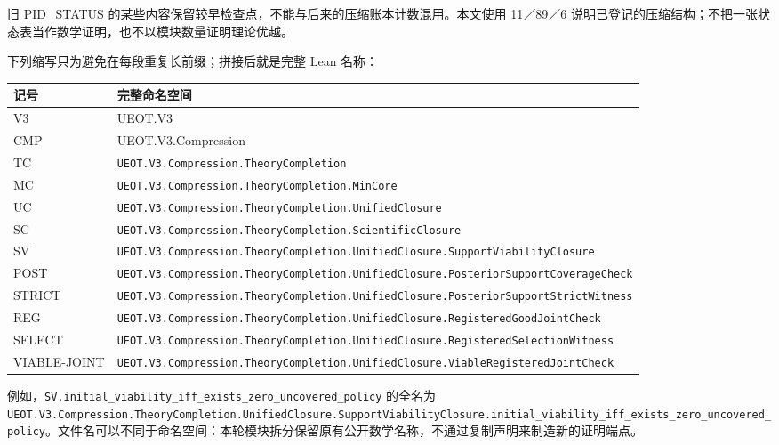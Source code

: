 \documentclass[
  11pt,
  oneside]{book}
\newcounter{none} %
\begin{document}
旧 PID\_STATUS 的某些内容保留较早检查点，不能与后来的压缩账本计数混用。本文使用 11／89／6 说明已登记的压缩结构；不把一张状态表当作数学证明，也不以模块数量证明理论优越。

下列缩写只为避免在每段重复长前缀；拼接后就是完整 Lean 名称：

{\def\LTcaptype{none} %
\begin{longtable}[]{@{}
  >{\raggedright\arraybackslash}p{}
  >{\raggedright\arraybackslash}p{}@{}}
\toprule\noalign{}
\begin{minipage}[b]{\linewidth}\raggedright
记号
\end{minipage} & \begin{minipage}[b]{\linewidth}\raggedright
完整命名空间
\end{minipage} \\
\midrule\noalign{}
\endhead
\bottomrule\noalign{}
\endlastfoot
V3 & UEOT.V3 \\
CMP & UEOT.V3.Compression \\
TC & \nolinkurl{UEOT.V3.Compression.TheoryCompletion} \\
MC & \nolinkurl{UEOT.V3.Compression.TheoryCompletion.MinCore} \\
UC & \nolinkurl{UEOT.V3.Compression.TheoryCompletion.UnifiedClosure} \\
SC & \nolinkurl{UEOT.V3.Compression.TheoryCompletion.ScientificClosure} \\
SV & \nolinkurl{UEOT.V3.Compression.TheoryCompletion.UnifiedClosure.SupportViabilityClosure} \\
POST & \nolinkurl{UEOT.V3.Compression.TheoryCompletion.UnifiedClosure.PosteriorSupportCoverageCheck} \\
STRICT & \nolinkurl{UEOT.V3.Compression.TheoryCompletion.UnifiedClosure.PosteriorSupportStrictWitness} \\
REG & \nolinkurl{UEOT.V3.Compression.TheoryCompletion.UnifiedClosure.RegisteredGoodJointCheck} \\
SELECT & \nolinkurl{UEOT.V3.Compression.TheoryCompletion.UnifiedClosure.RegisteredSelectionWitness} \\
VIABLE-JOINT & \nolinkurl{UEOT.V3.Compression.TheoryCompletion.UnifiedClosure.ViableRegisteredJointCheck} \\
\end{longtable}
}

例如，\nolinkurl{SV.initial_viability_iff_exists_zero_uncovered_policy} 的全名为 \nolinkurl{UEOT.V3.Compression.TheoryCompletion.UnifiedClosure.SupportViabilityClosure.initial_viability_iff_exists_zero_uncovered_policy}。文件名可以不同于命名空间：本轮模块拆分保留原有公开数学名称，不通过复制声明来制造新的证明端点。
\end{document}
